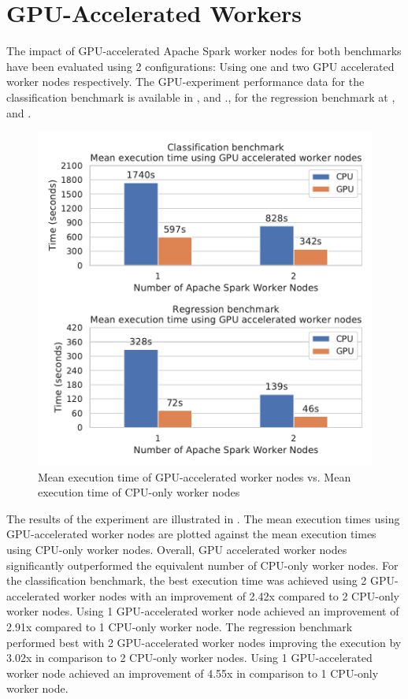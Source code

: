 \section{GPU-Accelerated Workers}
\label{sec:07_gpu}
The impact of GPU-accelerated Apache Spark worker nodes for both benchmarks have been evaluated using 2 configurations: Using one and two GPU accelerated worker nodes respectively.
%
The GPU-experiment performance data for the classification benchmark is available in , and ., for the regression benchmark at , and .


\begin{figure}[h]
\centering
\includegraphics[scale=0.9]{images/07_evaluation/overall_cpu_vs_gpu}
\caption{Mean execution time of GPU-accelerated worker nodes vs. Mean execution time of CPU-only worker nodes}
\label{fig:07_gpu_results}
\end{figure}
The results of the experiment are illustrated in .
The mean execution times using GPU-accelerated worker nodes are plotted against the mean execution times using CPU-only worker nodes.
Overall, GPU accelerated worker nodes significantly outperformed the equivalent number of CPU-only worker nodes.
For the classification benchmark, the best execution time was achieved using 2 GPU-accelerated worker nodes with an improvement of 2.42x compared to 2 CPU-only worker nodes. Using 1 GPU-accelerated worker node achieved an improvement of 2.91x compared to 1 CPU-only worker node.
The regression benchmark performed best with 2 GPU-accelerated worker nodes improving the execution by 3.02x in comparison to 2 CPU-only worker nodes. Using 1 GPU-accelerated worker node achieved an improvement of 4.55x in comparison to 1 CPU-only worker node.

